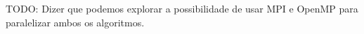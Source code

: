 TODO: Dizer que podemos explorar a possibilidade de usar MPI e OpenMP para paralelizar ambos os algoritmos.